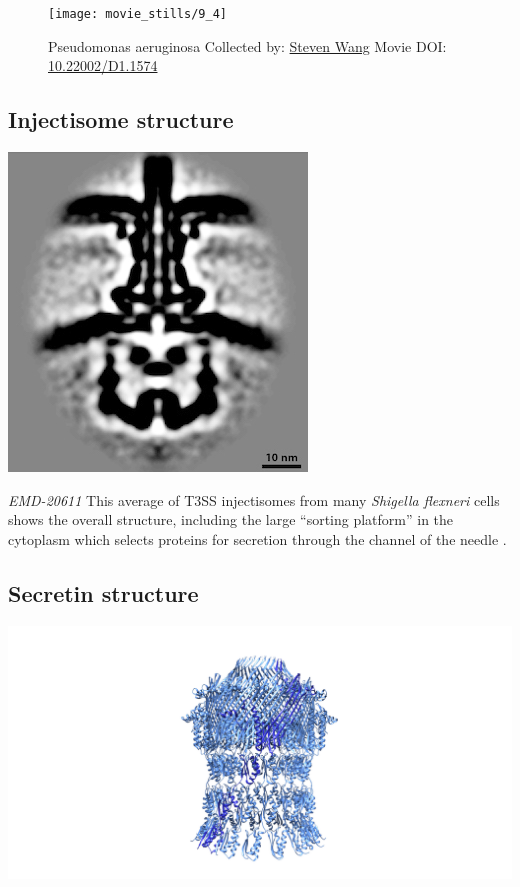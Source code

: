 \documentclass[]{tufte-book}
\begin{document}
\begin{figure}
\texttt{[image: movie\_stills/9\_4]} \caption[Pseudomonas aeruginosa Collected by:
\protect\hyperlink{steven_wang}{Steven Wang} Movie DOI:
\href{https://doi.org/10.22002/D1.1574}{10.22002/D1.1574}]{Pseudomonas aeruginosa Collected by:
\protect\hyperlink{steven_wang}{Steven Wang} Movie DOI:
\href{https://doi.org/10.22002/D1.1574}{10.22002/D1.1574}}\label{fig:9-4}
\end{figure}

\subsection{Injectisome structure}\label{Injectisome_structure}

\includegraphics{img/schematics/9_4_1}

\emph{EMD-20611} This average of T3SS injectisomes from many
\emph{Shigella flexneri} cells shows the overall structure, including
the large ``sorting platform'' in the cytoplasm which selects proteins
for secretion through the channel of the needle \citep{tachiyama2019}.

\subsection{Secretin structure}\label{Secretin_structure}

\includegraphics{img/schematics/9_4_2}
\end{document}
